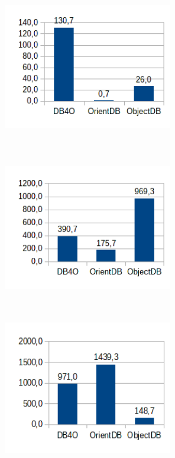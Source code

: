 \begin{figure}[!h]
\begin{subfigure}[b]{0.5\textwidth}
\includegraphics[width=20em, height=18em]{obr/bench/oodbms3}
\end{subfigure}
\begin{subfigure}[b]{0.5\textwidth}
\includegraphics[width=20em, height=18em]{obr/bench/oodbms4}
\end{subfigure}
\begin{subfigure}[b]{0.5\textwidth}
\includegraphics[width=20em, height=18em]{obr/bench/oodbms5}
\end{subfigure}
\begin{subfigure}[b]{0.5\textwidth}

\end{subfigure}
\end{figure}

